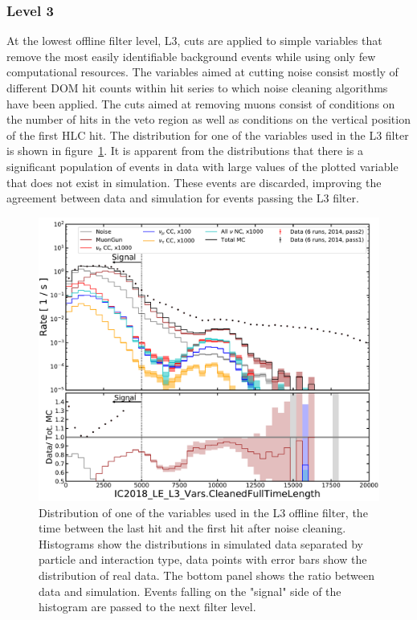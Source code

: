 \subsubsection{Level 3}
At the lowest offline filter level, L3, cuts are applied to simple variables that remove the most easily identifiable background events while using only few computational resources. The variables aimed at cutting noise consist mostly of different DOM hit counts within hit series to which noise cleaning algorithms have been applied. The cuts aimed at removing muons consist of conditions on the number of hits in the veto region as well as conditions on the vertical position of the first HLC hit. The distribution for one of the variables used in the L3 filter is shown in figure~\ref{fig:l3-var-cleaned-full-time-length}. It is apparent from the distributions that there is a significant population of events in data with large values of the plotted variable that does not exist in simulation. These events are discarded, improving the agreement between data and simulation for events passing the L3 filter.
\begin{figure}
    \centering
    \includegraphics[width=7 cm]{figures/icecube/selection/IC2018_LE_L3_Vars_CleanedFullTimeLength.pdf}
    \caption{Distribution of one of the variables used in the L3 offline filter, the time between the last hit and the first hit after noise cleaning. Histograms show the distributions in simulated data separated by particle and interaction type, data points with error bars show the distribution of real data. The bottom panel shows the ratio between data and simulation. Events falling on the "signal" side of the histogram are passed to the next filter level.}
    \label{fig:l3-var-cleaned-full-time-length}
\end{figure}

